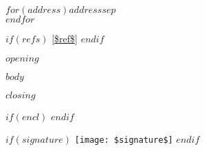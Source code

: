 \documentclass[11pt]{lettre}
\makeatletter
\newcommand*{\NoRule}{\renewcommand*{\rule@length}{0}}
\makeatother
\begin{document}
%
\begin{letter}{
$for(address)$$address$$sep$\\$endfor$}
\date{$date$} 
\NoRule
\vspace{-100px}
%

$if(refs)$
\vref{$ref$} 
$endif$

\opening{$opening$}

$body$
\closing{$closing$}

$if(encl)$
$endif$

\begin{flushright}
$if(signature)$
\texttt{[image: \$signature\$]}
$endif$
\end{flushright}


\end{letter}
\end{document}
